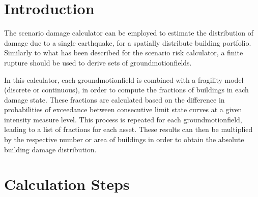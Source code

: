 

\section{Introduction}
The scenario damage calculator can be employed to estimate the distribution of damage due to a single earthquake, for a spatially distribute building portfolio. Similarly to what has been described for the scenario risk calculator, a finite \gls{rupture} should be used to derive sets of \glspl{groundmotionfield}. 

In this calculator, each \gls{groundmotionfield} is combined with a \gls{fragility model} (discrete or continuous), in order to compute the fractions of buildings in each damage state. These fractions are calculated based on the difference in probabilities of exceedance between consecutive limit state curves at a given intensity measure level. This process is repeated for each \gls{groundmotionfield}, leading to a list of fractions for each \gls{asset}. These results can then be multiplied by the respective number or area of buildings in order to obtain the absolute building damage distribution.

\section{Calculation Steps}

